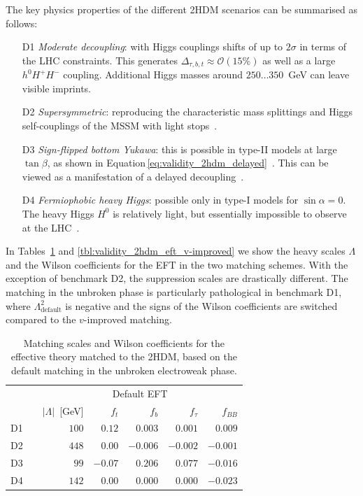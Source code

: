 The key physics properties of the different 2HDM scenarios can be
summarised as follows:
%
\begin{enumerate}
\item[D1] \emph{Moderate decoupling}: with Higgs couplings shifts of
  up to $2\sigma$ in terms of the LHC constraints.  This generates
  $\Delta_{\tau,b,t} \approx \mathcal{O}(15\%)$ as well as a large
  $h^0 H^+ H^-$ coupling. Additional Higgs masses around
  $250\dots350$~GeV can leave visible imprints.
%
\item[D2] \emph{Supersymmetric}: reproducing the characteristic mass
  splittings and Higgs self-couplings of the MSSM with light
  stops~\cite{Carena:2013ytb}.
%
\item[D3] \emph{Sign-flipped bottom Yukawa}: this is possible in
  type-II models at large $\tan\beta$, as shown in
  Equation\,\eqref{eq:validity_2hdm_delayed}~\cite{Ferreira:2014naa}. This
  can be viewed as a manifestation of a delayed
  decoupling~\cite{Haber:2000kq}.
%
\item[D4] \emph{Fermiophobic heavy Higgs}: possible only in type-I
  models for $\sin\alpha =0$. The heavy Higgs $H^0$ is relatively
  light, but essentially impossible to observe at the
  LHC~\cite{Hespel:2014sla}.
\end{enumerate}

In Tables~\ref{tbl:validity_2hdm_eft_default} and
\ref{tbl:validity_2hdm_eft_v-improved} we show the heavy scales
$\Lambda$ and the Wilson coefficients for the EFT in the two matching
schemes. With the exception of benchmark D2, the suppression scales
are drastically different. The matching in the unbroken phase is
particularly pathological in benchmark D1, where
$\Lambda_{\text{default}}^2$ is negative and the signs of the Wilson
coefficients are switched compared to the $v$-improved matching.

\begin{table}[t]
  \begin{tabular}{c c rrrrr }
    \toprule
    \multirow{2}{*}{}
    && \multicolumn{5}{c}{Default EFT} \\
    \cmidrule{3-7} 
    && $|\Lambda|$~[GeV] & $f_t$ & $f_{b}$  & $f_{\tau}$ & $f_{BB}$ \\
    \midrule
    D1 && $100$ & $0.12$ & $0.003$ & $0.001$ & $0.009$ \\
    D2 && $448$ & $0.00$ & $-0.006$ & $-0.002$  & $-0.001$ \\
    D3 && $99$ & $-0.07$ & $0.206$ & $0.077$ &  $-0.016$\\
    D4 && $142$ & $0.00$ & $0.000$ & $0.000$ &  $-0.023$\\
    \bottomrule
  \end{tabular}
  \caption[Default EFT description for the 2HDM benchmarks]{Matching scales and Wilson coefficients for the effective
    theory matched to the 2HDM, based on the default matching in the
    unbroken electroweak phase.}
 \label{tbl:validity_2hdm_eft_default}
\end{table}


